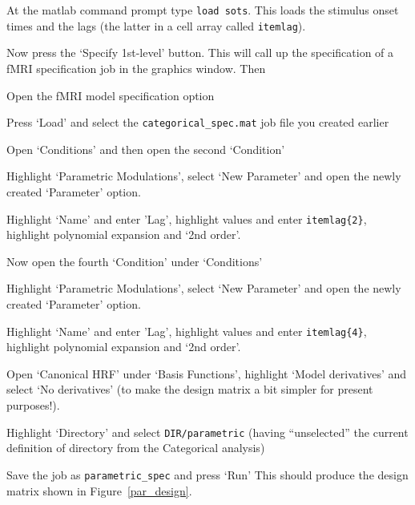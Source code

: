 \bi
\item{At the matlab command prompt type \verb!load sots!. This loads the stimulus onset times and the lags (the latter in a cell array called \verb!itemlag!).}
\ei

Now press the `Specify 1st-level' button. This will call up the specification of a fMRI specification job in the graphics window. Then
\bi
\item{Open the fMRI model specification option}
\item{Press `Load' and select the \verb!categorical_spec.mat! job file you created earlier}
\item{Open `Conditions' and then open the second `Condition'}
\item{Highlight `Parametric Modulations', select `New Parameter' and open the newly created `Parameter' option.}
\item{Highlight `Name' and enter 'Lag', highlight values and enter \verb!itemlag{2}!, highlight polynomial expansion and `2nd order'.}
\item{Now open the fourth `Condition' under `Conditions'}
\item{Highlight `Parametric Modulations', select `New Parameter' and open the newly created `Parameter' option.}
\item{Highlight `Name' and enter 'Lag', highlight values and enter \verb!itemlag{4}!, highlight polynomial expansion and `2nd order'.}
\item{Open `Canonical HRF' under `Basis Functions', highlight `Model derivatives' and select 
`No derivatives' (to make the design matrix a bit simpler for present purposes!).}
\item{Highlight `Directory' and select \verb!DIR/parametric! (having ``unselected'' the current definition of directory from the Categorical analysis)}
\item{Save the job as \verb!parametric_spec! and press `Run'}
\ei
This should produce the design matrix shown in Figure~\ref{par_design}.
